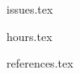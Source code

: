 \documentclass[a4paper,11pt]{article}
\begin{document}




{issues.tex}





{hours.tex}

{references.tex}
\end{document}

